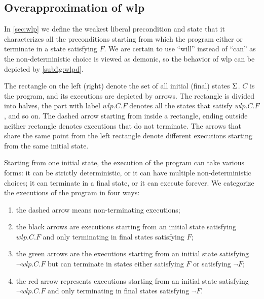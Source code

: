 \subsection{Overapproximation of wlp}
In \autoref{sec:wlp} we define the weakest liberal precondition and state that it characterizes all the preconditions starting from which the program either  or  terminate in a state satisfying $F$. 
We are certain to use ``will'' instead of ``can'' as the non-deterministic choice is viewed as demonic, so the behavior of wlp can be depicted by \autoref{subfig:wlpd}. 

The rectangle on the left (right) denote the set of all initial (final) states $\S$. 
$C$ is the program, and its executions are depicted by arrows. 
The rectangle is divided into halves, the part with label $wlp.C.F$ denotes all the states that satisfy $wlp.C.F$, and so on. 
The dashed arrow starting from inside a rectangle, ending outside neither rectangle denotes executions that do not terminate. 
The arrows that share the same point from the left rectangle denote different executions starting from the same initial state. 

Starting from one initial state, the execution of the program can take various forms: it can be strictly deterministic, or it can have multiple non-deterministic choices; it can terminate in a final state, or it can execute forever. 
We categorize the executions of the program in four ways: 
\begin{enumerate}
	\item the dashed arrow means non-terminating executions; 
	\item the black arrows are executions starting from an initial state satisfying $wlp.C.F$ and only terminating in final states satisfying $F$; 
	\item the green arrows are the executions starting from an initial state satisfying $\neg wlp.C.F$ but can terminate in states either satisfying $F$ or satisfying $\neg F$;
	\item the red arrow represents executions starting from an initial state satisfying $\neg wlp.C.F$ and only terminating in final states satisfying $\neg F$. 
\end{enumerate}


